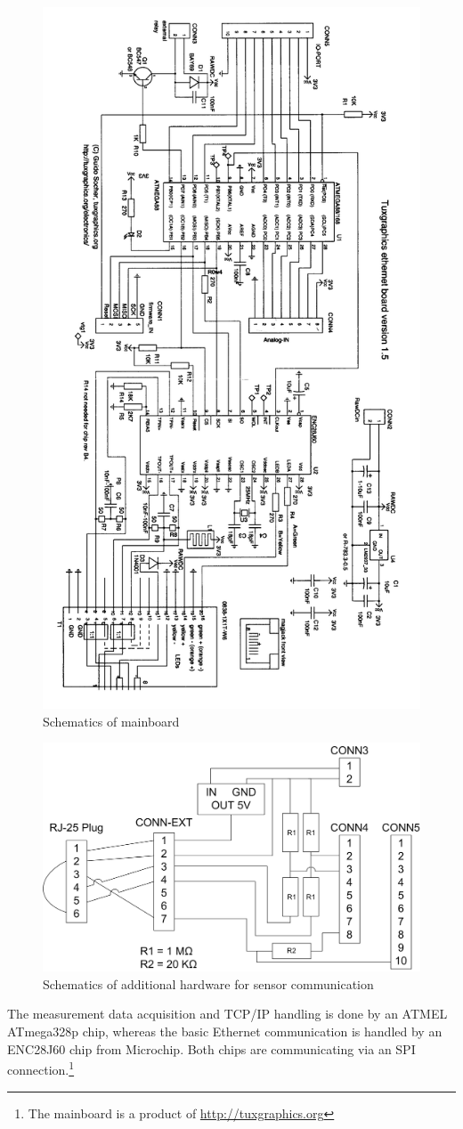 \begin{figure}[ht]
    \centering
    \includegraphics[width=0.6\linewidth]{graphics/schematics1.png}
    \caption{Schematics of mainboard}
    \label{fig:mainboard_schematic1}
\end{figure}

\begin{figure}[ht]
    \centering
    \includegraphics[width=0.6\linewidth]{graphics/schematics.png}
    \caption{Schematics of additional hardware for sensor communication}
    \label{fig:mainboard_schematic}
\end{figure}

The measurement data acquisition and TCP/IP handling is done by an ATMEL ATmega328p chip, whereas the basic Ethernet communication is handled by an ENC28J60 chip from Microchip. Both chips are communicating via an SPI connection.\footnote{The mainboard is a product of \url{http://tuxgraphics.org}} 

